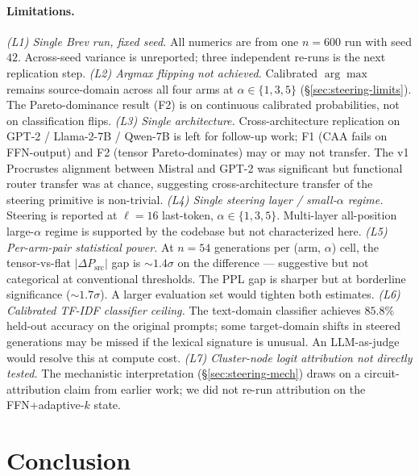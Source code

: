 \documentclass[10pt,twocolumn]{article}
\begin{document}
\paragraph{Limitations.}
\textit{(L1) Single Brev run, fixed seed.} All numerics are from one $n{=}600$ run with seed $42$. Across-seed variance is unreported; three independent re-runs is the next replication step.
\textit{(L2) Argmax flipping not achieved.} Calibrated $\arg\max$ remains source-domain across all four arms at $\alpha\in\{1,3,5\}$ (\S\ref{sec:steering-limits}). The Pareto-dominance result (F2) is on continuous calibrated probabilities, not on classification flips.
\textit{(L3) Single architecture.} Cross-architecture replication on GPT-2 / Llama-2-7B / Qwen-7B is left for follow-up work; F1 (CAA fails on FFN-output) and F2 (tensor Pareto-dominates) may or may not transfer. The v1 Procrustes alignment between Mistral and GPT-2 was significant but functional router transfer was at chance, suggesting cross-architecture transfer of the steering primitive is non-trivial.
\textit{(L4) Single steering layer / small-$\alpha$ regime.} Steering is reported at $\ell{=}16$ last-token, $\alpha\in\{1,3,5\}$. Multi-layer all-position large-$\alpha$ regime is supported by the codebase but not characterized here.
\textit{(L5) Per-arm-pair statistical power.} At $n{=}54$ generations per (arm, $\alpha$) cell, the tensor-vs-flat $|\Delta P_{\text{src}}|$ gap is $\sim 1.4\sigma$ on the difference --- suggestive but not categorical at conventional thresholds. The PPL gap is sharper but at borderline significance ($\sim 1.7\sigma$). A larger evaluation set would tighten both estimates.
\textit{(L6) Calibrated TF-IDF classifier ceiling.} The text-domain classifier achieves $85.8\%$ held-out accuracy on the original prompts; some target-domain shifts in steered generations may be missed if the lexical signature is unusual. An LLM-as-judge would resolve this at compute cost.
\textit{(L7) Cluster-node logit attribution not directly tested.} The mechanistic interpretation (\S\ref{sec:steering-mech}) draws on a circuit-attribution claim from earlier work; we did not re-run attribution on the FFN+adaptive-$k$ state.

\section{Conclusion}
\label{sec:conc}
\end{document}
